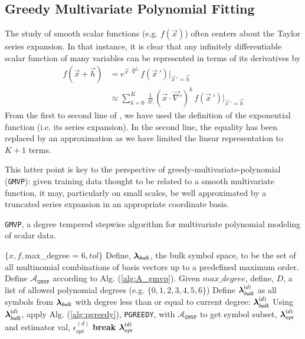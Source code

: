 \documentclass[twocolumn,aps,prd,floatfix,preprintnumbers,a4paper,nofootinbib,
superscriptaddress,10pt]{revtex4-1}
\def\gmvp#1{greedy-multivariate-polynomial#1
  (\texttt{GMVP}#1)\gdef\gmvp{\texttt{GMVP}}}
\def\pgreedy{\texttt{PGREEDY}}
\begin{document}
\subsection{Greedy Multivariate Polynomial Fitting}
%
The study of smooth scalar functions (e.g. $f(\vec{x})$) often centers about the Taylor series expansion.
%
In that instance, it is clear that any infinitely differentiable scalar function of many variables can be represented in terms of its derivatives by
%
\begin{align}
  \label{eq:mvt}
  f( \vec{x} + \vec{h} ) &= e^{ \vec{x} \cdot \vec{\nabla}' } \, f(\vec{x}\,') |_{\vec{x}\,'=\vec{h}}
  \\ \nonumber
  &\approx \sum_{k=0}^{K} \, \frac{1}{k!} \, (\vec{x} \cdot \vec{\nabla}')^{k} \, f(\vec{x}\,') |_{\vec{x}\,'=\vec{h}}
\end{align}
%
From the first to second line of , we have used the definition of the exponential function (i.e. its series expansion).
%
In the second line, the equality has been replaced by an approximation as we have limited the linear representation to $K+1$ terms.
%
\par This latter point is key to the perspective of \gmvp{}:
%
given training data thought to be related to a smooth multivariate function, it may, particularly on small scales, be well approximated by a truncated series expansion in an appropriate coordinate basis.
%
\hspace{1cm}
{\scriptsize
\begin{algorithm}[H]
  \caption{\gmvp{}, a degree tempered stepwise algorithm for multivariate polynomial modeling of scalar data.}
  \label{alg:gmvp}
  \begin{algorithmic}[1]
     $ \{ x, f, $max\_degree = 6$, tol \}$
    \vskip 10pt
    \State Define, ${\bm{\lambda}}_{bulk}$, the bulk symbol space, to be the set of all multinomial combinations of basis vectors up to a predefined maximum order.
    \State Define $\mathcal{A}_{\gmvp{}}$ according to Alg. (\ref{alg:A_gmvp}).
    \State Given $max\_degree$, define, ${ D}$, a list of allowed polynomial degrees (e.g. $\{0,1,2,3,4,5,6\}$)
      \State Define ${\bm{\lambda}}_{bulk}^{(d)}$ as all symbols from ${\bm{\lambda}}_{bulk}$ with degree less than or equal to current degree: ${\bm{\lambda}}^{(d)}_{bulk}$
      \State Using ${\bm{\lambda}}_{bulk}^{(d)}$, apply Alg. (\ref{alg:pgreedy}), \pgreedy{}, with $\mathcal{A}_{\gmvp{}}$ to get symbol subset, ${\bm{\lambda}}^{(d)}_{opt}$ and estimator val, $\epsilon^{(d)}_{opt}$
        \State \textbf{break}
      \EndIf
    \EndFor
    \vskip 10pt
     ${\bm{\lambda}}^{(d)}_{opt}$
  \end{algorithmic}
\end{algorithm}
}
\end{document}
